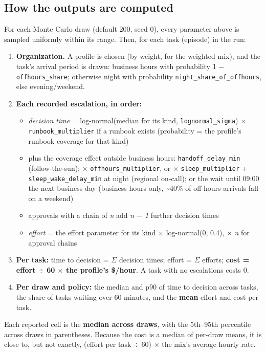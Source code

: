 \documentclass[letterpaper,twocolumn,10pt]{article}
\begin{document}
\subsection*{How the outputs are computed}

For each Monte Carlo draw (default 200, seed 0), every parameter above is sampled uniformly within its range. Then, for each task (episode) in the run:

\begin{enumerate}
\item \textbf{Organization.} A profile is chosen (by weight, for the weighted mix), and the task's arrival period is drawn: business hours with probability 1 $-$ \texttt{offhours\_share}; otherwise night with probability \texttt{night\_share\_of\_offhours}, else evening/weekend.
\item \textbf{Each recorded escalation, in order:}
\begin{itemize}
\item \emph{decision time} = log-normal(median for its kind, \texttt{lognormal\_sigma}) $\times$ \texttt{runbook\_multiplier} if a runbook exists (probability = the profile's runbook coverage for that kind)
\item plus the coverage effect outside business hours: \texttt{handoff\_delay\_min} (follow-the-sun); $\times$ \texttt{offhours\_multiplier}, or $\times$ \texttt{sleep\_multiplier} + \texttt{sleep\_wake\_delay\_min} at night (regional on-call); or the wait until 09:00 the next business day (business hours only, \textasciitilde{}40\% of off-hours arrivals fall on a weekend)
\item approvals with a chain of \emph{n} add \emph{n $-$ 1} further decision times
\item \emph{effort} = the effort parameter for its kind $\times$ log-normal(0, 0.4), $\times$ \emph{n} for approval chains
\end{itemize}
\item \textbf{Per task:} time to decision = $\Sigma$ decision times; effort = $\Sigma$ efforts; \textbf{cost = effort $\div$ 60 $\times$ the profile's \$/hour}. A task with no escalations costs 0.
\item \textbf{Per draw and policy:} the median and p90 of time to decision across tasks, the share of tasks waiting over 60 minutes, and the \textbf{mean} effort and cost per task.
\end{enumerate}

Each reported cell is the \textbf{median across draws}, with the 5th--95th percentile across draws in parentheses. Because the cost is a median of per-draw means, it is close to, but not exactly, (effort per task $\div$ 60) $\times$ the mix's average hourly rate.
\end{document}
